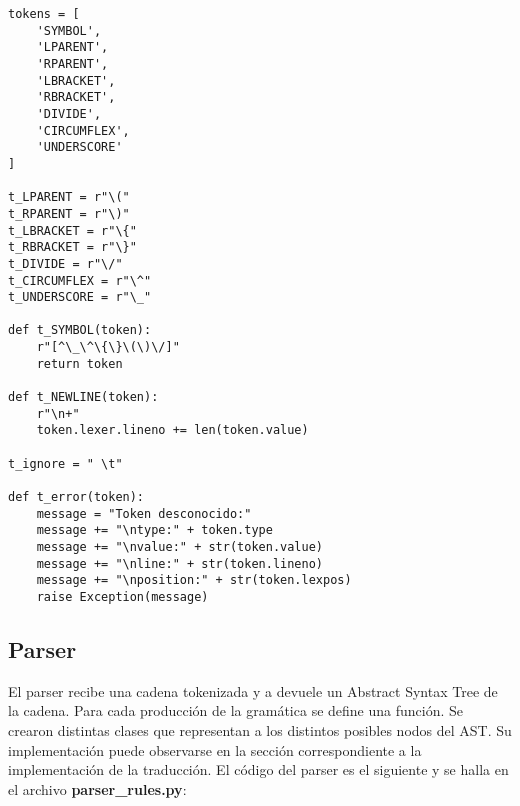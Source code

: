\begin{verbatim}
tokens = [
	'SYMBOL',
	'LPARENT',
	'RPARENT',
	'LBRACKET',
	'RBRACKET',
	'DIVIDE',
	'CIRCUMFLEX',
	'UNDERSCORE'
]

t_LPARENT = r"\("
t_RPARENT = r"\)"
t_LBRACKET = r"\{"
t_RBRACKET = r"\}"
t_DIVIDE = r"\/"
t_CIRCUMFLEX = r"\^"
t_UNDERSCORE = r"\_"

def t_SYMBOL(token):
	r"[^\_\^\{\}\(\)\/]"
	return token

def t_NEWLINE(token):
    r"\n+"
    token.lexer.lineno += len(token.value)

t_ignore = " \t"

def t_error(token):
    message = "Token desconocido:"
    message += "\ntype:" + token.type
    message += "\nvalue:" + str(token.value)
    message += "\nline:" + str(token.lineno)
    message += "\nposition:" + str(token.lexpos)
    raise Exception(message)
\end{verbatim}

\subsection{Parser}

\indent \indent El parser recibe una cadena tokenizada y a devuele un Abstract Syntax Tree de la cadena. Para cada producción de la gramática se define una función. Se crearon distintas clases que representan a los distintos posibles nodos del AST. Su implementación puede observarse en la sección correspondiente a la implementación de la traducción. El código del parser es el siguiente y se halla en el archivo \textbf{parser\_rules.py}:\\

